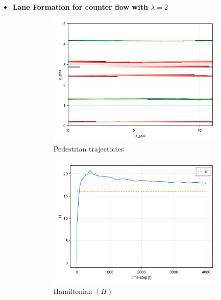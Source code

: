 \begin{itemize}
    \item \textbf{Lane Formation for counter flow with $\lambda = 2$}
    \begin{figure}[H]
        \centering
        \begin{subfigure}{\textwidth}
            \centering
            \includegraphics[width=0.6\linewidth]{figures/s0_fbh_1noflow_10000.png}
            \caption{Pedestrian trajectories}
            \label{plot:counter_traj}
        \end{subfigure}
        \begin{subfigure}{.40\textwidth}
            \centering
            \includegraphics[width=\linewidth]{figures/H_counter.png}
            \caption{Hamiltonian $(H)$}
            \label{plot:counter_h}
        \end{subfigure}
        \begin{subfigure}{.40\textwidth}
            \centering

\end{subfigure}
\end{figure}
\end{itemize}
